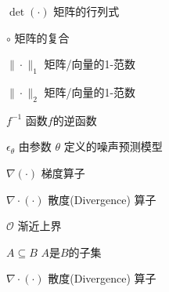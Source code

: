 \begin{denotation}[3cm]
\item [$\operatorname{det}(\cdot)$] 矩阵的行列式
\item[$\circ$] 矩阵的复合
\item[$\|\cdot \|_1$] 矩阵/向量的1-范数

\item[$\|\cdot \|_2$] 矩阵/向量的1-范数

\item[$f^{-1}$] 函数$f$的逆函数

\item[ $\epsilon_{\theta}$] 由参数 $\theta$ 定义的噪声预测模型

\item[$\nabla(\cdot)$] 梯度算子
\item[$\nabla\cdot (\cdot)$] 散度(Divergence) 算子

\item[$\mathcal{O}$] 渐近上界

\item[$A\subseteq B$] $A$是$B$的子集

\item[$\nabla\cdot (\cdot)$] 散度(Divergence) 算子

  
  
  
  
  
\end{denotation}






